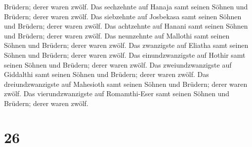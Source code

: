 Brüdern; derer waren zwölf.  Das sechzehnte auf Hanaja samt
seinen Söhnen und Brüdern; derer waren zwölf.  Das
siebzehnte auf Josbekasa samt seinen Söhnen und Brüdern; derer waren
zwölf.  Das achtzehnte auf Hanani samt seinen Söhnen und
Brüdern; derer waren zwölf.  Das neunzehnte auf Mallothi
samt seinen Söhnen und Brüdern; derer waren zwölf.  Das
zwanzigste auf Eliatha samt seinen Söhnen und Brüdern; derer waren
zwölf.  Das einundzwanzigste auf Hothir samt seinen Söhnen
und Brüdern; derer waren zwölf.  Das zweiundzwanzigste auf
Giddalthi samt seinen Söhnen und Brüdern; derer waren zwölf.
 Das dreiundzwanzigste auf Mahesioth samt seinen Söhnen und
Brüdern; derer waren zwölf.  Das vierundzwanzigste auf
Romamthi-Eser samt seinen Söhnen und Brüdern; derer waren zwölf.

\hypertarget{section-25}{%
\section{26}\label{section-25}}

